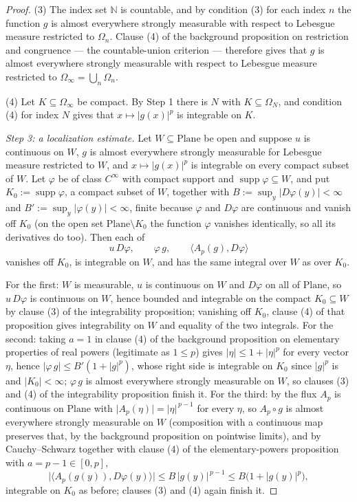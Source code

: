 \begin{proof}
(3) The index set $\mathbb{N}$ is countable, and by condition (3) for each index $n$ the
function $g$ is almost everywhere strongly measurable with respect to Lebesgue measure
restricted to $\Omega_n$.  Clause (4) of the background proposition on restriction and
congruence --- the countable-union criterion --- therefore gives that $g$ is almost everywhere
strongly measurable with respect to Lebesgue measure restricted to
$\Omega_\infty=\bigcup_n\Omega_n$.

(4) Let $K\subseteq\Omega_\infty$ be compact.  By Step 1 there is $N$ with
$K\subseteq\Omega_N$, and condition (4) for index $N$ gives that
$x\mapsto\lvert g(x)\rvert^{p}$ is integrable on $K$.

\medskip\noindent\emph{Step 3: a localization estimate.}
Let $W\subseteq\mathrm{Plane}$ be open and suppose $u$ is continuous on $W$, $g$ is almost
everywhere strongly measurable for Lebesgue measure restricted to $W$, and
$x\mapsto\lvert g(x)\rvert^{p}$ is integrable on every compact subset of $W$.  Let $\varphi$ be
of class $C^\infty$ with compact support and $\operatorname{supp}\varphi\subseteq W$, and put
$K_0:=\operatorname{supp}\varphi$, a compact subset of $W$, together with
$B:=\sup_y\lvert D\varphi(y)\rvert<\infty$ and $B':=\sup_y\lvert\varphi(y)\rvert<\infty$, finite
because $\varphi$ and $D\varphi$ are continuous and vanish off $K_0$ (on the open set
$\mathrm{Plane}\setminus K_0$ the function $\varphi$ vanishes identically, so all its
derivatives do too).  Then each of
\[
  u\,D\varphi,\qquad \varphi\,g,\qquad \bigl\langle A_p(g),D\varphi\bigr\rangle
\]
vanishes off $K_0$, is integrable on $W$, and has the same integral over $W$ as over $K_0$.

For the first: $W$ is measurable, $u$ is continuous on $W$ and $D\varphi$ on all of
$\mathrm{Plane}$, so $u\,D\varphi$ is continuous on $W$, hence bounded and integrable on the
compact $K_0\subseteq W$ by clause (3) of the integrability proposition; vanishing off $K_0$,
clause (4) of that proposition gives integrability on $W$ and equality of the two integrals.
For the second: taking $a=1$ in clause (4) of the background proposition on elementary
properties of real powers (legitimate as $1\le p$) gives
$\lvert\eta\rvert\le1+\lvert\eta\rvert^{p}$ for every vector $\eta$, hence
$\lvert\varphi\,g\rvert\le B'(1+\lvert g\rvert^{p})$, whose right side is integrable on $K_0$
since $\lvert g\rvert^{p}$ is and $\lvert K_0\rvert<\infty$; $\varphi\,g$ is almost everywhere
strongly measurable on $W$, so clauses (3) and (4) of the integrability proposition finish it.
For the third: by  the flux $A_p$ is continuous on $\mathrm{Plane}$ with
$\lvert A_p(\eta)\rvert=\lvert\eta\rvert^{\,p-1}$ for every $\eta$, so $A_p\circ g$ is almost
everywhere strongly measurable on $W$ (composition with a continuous map preserves that, by the
background proposition on pointwise limits), and by Cauchy--Schwarz together with clause (4) of
the elementary-powers proposition with $a=p-1\in[0,p]$,
\[
  \bigl\lvert\bigl\langle A_p(g(y)),D\varphi(y)\bigr\rangle\bigr\rvert
  \le B\,\lvert g(y)\rvert^{\,p-1}\le B\bigl(1+\lvert g(y)\rvert^{p}\bigr),
\]
integrable on $K_0$ as before; clauses (3) and (4) again finish it.


\end{proof}
